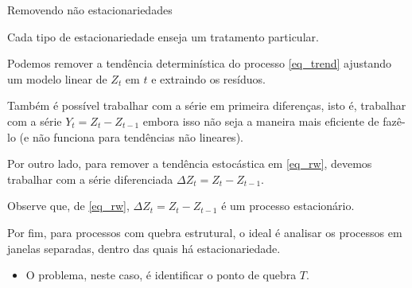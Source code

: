 \documentclass[11pt]{beamer}
\newenvironment{halfwideitemize}{\itemize\addtolength{\itemsep}{0.5em}}{\enditemize}
\begin{document}
\begin{frame}{Removendo não estacionariedades}
	\begin{halfwideitemize}
		\item Cada tipo de estacionariedade enseja um tratamento particular.
		\item Podemos remover a tendência determinística do processo \eqref{eq_trend} ajustando um modelo linear de $Z_t$ em $t$ e extraindo os resíduos.
		\begin{halfwideitemize}
			\item Também é possível trabalhar com a série em {\color{blue}primeira diferenças}, isto é, trabalhar com a série $Y_t = Z_{t} - Z_{t-1}$ embora isso não seja a maneira mais eficiente de fazê-lo (e não funciona para tendências não lineares).
		\end{halfwideitemize}
		\item Por outro lado, para remover a tendência estocástica em \eqref{eq_rw}, devemos trabalhar com a {\color{blue}série diferenciada} $\Delta Z_t = Z_{t} - Z_{t-1}$.
		\begin{halfwideitemize}
			\item Observe que, de \eqref{eq_rw}, $\Delta Z_t = Z_t-Z_{t-1}$ é um processo estacionário.
		\end{halfwideitemize} 
		\item Por fim, para processos com quebra estrutural, o ideal é analisar os processos em janelas separadas, dentro das quais há estacionariedade.
		\begin{itemize}
			\vspace{-1em}
			\item O problema, neste caso, é identificar o ponto de quebra $T$.
		\end{itemize}
	\end{halfwideitemize}
\end{frame}
\end{document}
